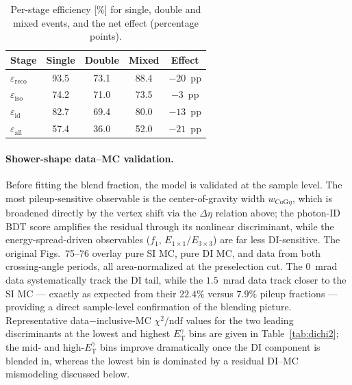 \documentclass[11pt]{article}
\newcommand{\ETg}{E_{\mathrm{T}}^{\gamma}}
\begin{document}
\begin{table}[h]
\centering
\caption{Per-stage efficiency [\%] for single, double and mixed events, and the
net effect (percentage points).}
\label{tab:dieff}
\begin{tabular}{lcccc}
\toprule
Stage & Single & Double & Mixed & Effect \\
\midrule
$\varepsilon_{\mathrm{reco}}$ & 93.5 & 73.1 & 88.4 & $-20$~pp \\
$\varepsilon_{\mathrm{iso}}$  & 74.2 & 71.0 & 73.5 & $-3$~pp  \\
$\varepsilon_{\mathrm{id}}$   & 82.7 & 69.4 & 80.0 & $-13$~pp \\
$\varepsilon_{\mathrm{all}}$  & 57.4 & 36.0 & 52.0 & $-21$~pp \\
\bottomrule
\end{tabular}
\end{table}

\paragraph{Shower-shape data--MC validation.} Before fitting the blend fraction,
the model is validated at the sample level. The most pileup-sensitive observable
is the center-of-gravity width $w_{\mathrm{CoG}\eta}$, which is broadened directly
by the vertex shift via the $\Delta\eta$ relation above; the photon-ID BDT score
amplifies the residual through its nonlinear discriminant, while the
energy-spread-driven observables ($f_1$, $E_{1\times1}/E_{3\times3}$) are far less
DI-sensitive. The original Figs.~75--76 overlay pure SI MC, pure DI MC, and data
from both crossing-angle periods, all area-normalized at the preselection cut. The
$0$~mrad data systematically track the DI tail, while the $1.5$~mrad data track
closer to the SI MC --- exactly as expected from their $22.4\%$ versus $7.9\%$
pileup fractions --- providing a direct sample-level confirmation of the blending
picture. Representative data$-$inclusive-MC $\chi^2/\mathrm{ndf}$ values for the
two leading discriminants at the lowest and highest $\ETg$ bins are given in
Table~\ref{tab:dichi2}; the mid- and high-$\ETg$ bins improve dramatically once
the DI component is blended in, whereas the lowest bin is dominated by a residual
DI--MC mismodeling discussed below.
\end{document}
